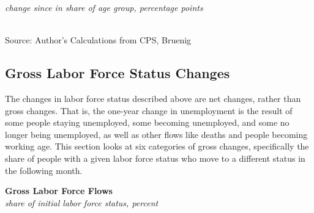 \documentclass{report}
\newcommand{\tbllink}[1]{\href{https://raw.githubusercontent.com/bdecon/US-chartbook/master/chartbook/data/#1}{\faTable}}
\newcommand{\ctsbar}[5]{
		\addplot[ybar stacked, bar width=#5, draw opacity=0, fill=#1] 
			table [x=#2, y=#3, col sep=comma]{#4};}
\newcommand{\bbar}[2]{extra #1 ticks = {{#2}}, extra #1 tick labels = ,
		extra #1 tick style = {grid=major, grid style={thick, black!25}},}
\begin{document}
{\begin{minipage}{0.76\textwidth}
\footnotesize{\textit{change since in share of age group, percentage points}}\\
\hspace*{-3mm} \\
\footnotesize{Source: Author's Calculations from CPS, Bruenig} \hfill \tbllink{lfs_age.csv} \tbllink{lfs_age_ch.csv}
\end{minipage}
\newpage
\subsection*{Gross Labor Force Status Changes}
\begin{minipage}{0.76\textwidth}
\small The changes in labor force status described above are net changes, rather than gross changes. That is, the one-year change in unemployment is the result of some people staying unemployed, some becoming unemployed, and some no longer being unemployed, as well as other flows like deaths and people becoming working age. This section looks at six categories of gross changes, specifically the share of people with a given labor force status who move to a different status in the following month. 
\end{minipage}
\vspace{2mm}

\normalsize \textbf{Gross Labor Force Flows}\\
\footnotesize{\textit{share of initial labor force status, percent}}

}
\end{document}
